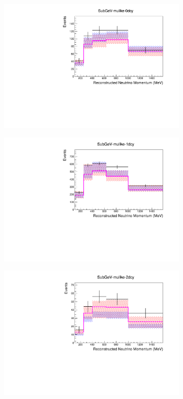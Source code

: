 \begin{figure}[h]
\begin{subfigure}[t]{0.49\textwidth}
    \includegraphics[width=\textwidth, trim={0mm 0mm 0mm 0mm}, clip,page=1]{Figures/Selections/Predictive_SubGeV-mulike-0dcy.pdf}
  \end{subfigure}%
  \begin{subfigure}[t]{0.49\textwidth}
    \includegraphics[width=\textwidth, trim={0mm 0mm 0mm 0mm}, clip,page=1]{Figures/Selections/Predictive_SubGeV-mulike-1dcy.pdf}
  \end{subfigure}
  \begin{subfigure}[t]{0.49\textwidth}
    \includegraphics[width=\textwidth, trim={0mm 0mm 0mm 0mm}, clip,page=1]{Figures/Selections/Predictive_SubGeV-mulike-2dcy.pdf}

\end{subfigure}
\end{figure}
